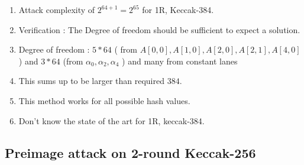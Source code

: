 \documentclass{article}
\begin{document}
\begin{enumerate}
    \item Attack complexity of $2^{64 + 1} = 2^{65}$ for 1R, Keccak-384.
    \item Verification : The Degree of freedom should be sufficient to expect a solution.
    \item Degree of freedom : $5*64$ ( from  $A[0,0], A[1,0], A[2,0], A[2,1], A[4,0]$) and $3*64$ (from $\alpha_0, \alpha_2, \alpha_4$ ) and many from constant lanes
    \item This sums up to be larger than required $384$.
    \item This method works for all possible hash values.
    \item Don't know the state of the art for 1R, keccak-384.
\end{enumerate}

\subsection{Preimage attack on 2-round Keccak-256}
\end{document}
